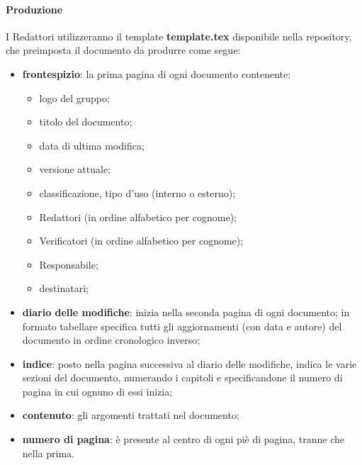 		\paragraph{Produzione}
		I Redattori utilizzeranno il template \textbf{template.tex} disponibile nella repository, che preimposta il documento da produrre come segue:
		\begin{itemize}
			\item \textbf{frontespizio}: la prima pagina di ogni documento contenente:
			\begin{itemize}
				\item logo del gruppo;
				\item titolo del documento;
				\item data di ultima modifica;
				\item versione attuale;
				\item classificazione, tipo d'uso (interno o esterno);
				\item Redattori (in ordine alfabetico per cognome);
				\item Verificatori (in ordine alfabetico per cognome);
				\item Responsabile;
				\item destinatari;
			\end{itemize}
			\item \textbf{diario delle modifiche}: inizia nella seconda pagina di ogni documento; in formato tabellare specifica tutti gli aggiornamenti (con data e autore) del documento in ordine cronologico inverso;
			\item \textbf{indice}: posto nella pagina successiva al diario delle modifiche, indica le varie sezioni del documento, numerando i capitoli e specificandone il numero di pagina in cui ognuno di essi inizia;
			\item \textbf{contenuto}: gli argomenti trattati nel documento;
			\item \textbf{numero di pagina}: è presente al centro di ogni piè di pagina, tranne che nella prima.
		\end{itemize}
		
